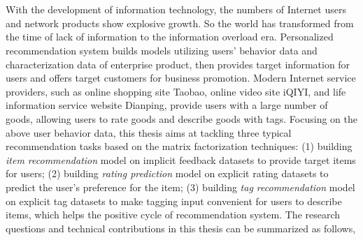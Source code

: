 \newpage
\vspace{-1cm}
\chapter*{}
\vspace{-0.5cm}

With the development of information technology, the numbers of Internet users and network products show explosive growth.  So the world has transformed from the time of lack of information to the information overload era. Personalized recommendation system builds models utilizing users' behavior data and characterization data of enterprise product, then provides target information for users and offers target customers for business promotion.  Modern Internet service providers, such as online shopping site Taobao, online video site iQIYI, and life information service website Dianping, provide users with a large number of goods, allowing users to rate goods and describe goods with tags.  Focusing on the above user behavior data, this thesis aims at tackling three typical recommendation tasks based on the matrix factorization techniques: (1) building \textit{item recommendation} model on  implicit feedback datasets  to provide target items for users; (2)  building \textit{rating prediction} model on explicit rating datasets to predict the user's preference for the item; (3) building \textit{tag recommendation} model on explicit tag datasets to make tagging input convenient for users to describe items, which  helps the positive cycle of recommendation system.  The research questions and technical contributions in this thesis can be summarized as follows,


